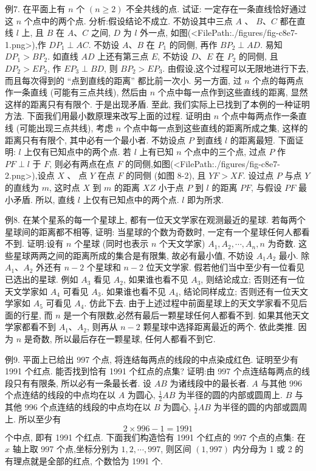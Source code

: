 例7. 在平面上有 $n$ 个 $(n \geqslant 2)$ 不全共线的点.
试证: 一定存在一条直线恰好通过这 $n$ 个点中的两个点.
分析:假设结论不成立.
不妨设其中三点 $A$ 、 $B 、 C$ 都在直线 $l$ 上, 且 $B$ 在 $A 、 C$ 之间, $D$ 为 $l$ 外一点, 如图(<FilePath:./figures/fig-c8e7-1.png>),作 $D P_1 \perp A C$. 不妨设 $A 、 B$ 在 $P_1$ 的同侧, 再作 $B P_2 \perp A D$. 易知 $D P_1>B P_2$. 如直线 $A D$ 上还有第三点 $E$, 不妨设 $D 、 E$ 在 $P_2$ 的同侧, 且 $D P_2>E P_2$, 作 $E P_3 \perp B D$, 则 $B P_2> E P_3$. 由假设,这个过程可以无限地进行下去, 而且每次得到的 “点到直线的距离” 都比前一次小.
另一方面, 过 $n$ 个点的每两点作一条直线 (可能有三点共线), 然后由 $n$ 个点中每一点作到这些直线的距离, 显然这样的距离只有有限个.
于是出现矛盾.
至此, 我们实际上已找到了本例的一种证明方法.
下面我们用最小数原理来改写上面的过程.
证明由 $n$ 个点中每两点作一条直线 (可能出现三点共线), 考虑 $n$ 个点中每一点到这些直线的距离所成之集, 这样的距离只有有限个, 其中必有一个最小者.
不妨设点 $P$ 到直线 $l$ 的距离最短.
下面证明: $l$ 上仅有已知点中的两个点.
若 $l$ 上有已知 $n$ 个点中的三个点, 过点 $P$ 作 $P F \perp l$ 于 $F$, 则必有两点在点 $F$ 的同侧,如图(<FilePath:./figures/fig-c8e7-2.png>),设点 $X$ 、 点 $Y$ 在点 $F$ 的同侧 (如图 8-2), 且 $Y F>X F$. 设过点 $P$ 与点 $Y$ 的直线为 $m$, 这时点 $X$ 到 $m$ 的距离 $X Z$ 小于点 $P$ 到 $l$ 的距离 $P F$, 与假设 $P F$ 最小矛盾.
所以, 直线 $l$ 上仅有已知点中的两个点.
$l$ 即为所求.



例8. 在某个星系的每一个星球上, 都有一位天文学家在观测最近的星球.
若每两个星球间的距离都不相等, 证明: 当星球的个数为奇数时, 一定有一个星球任何人都看不到.
证明:设有 $n$ 个星球 (同时也表示 $n$ 个天文学家) $A_1, A_2, \cdots, A_n, n$ 为奇数.
这些星球两两之间的距离所成的集合是有限集, 故必有最小值, 不妨设 $A_1 A_2$ 最小.
除 $A_1 、 A_2$ 外还有 $n-2$ 个星球和 $n-2$ 位天文学家.
假若他们当中至少有一位看见已选出的星球.
例如 $A_3$ 看见 $A_2$, 如果谁也看不见 $A_3$, 则结论成立; 否则还有一位天文学家如 $A_4$ 可看见 $A_3$. 如果谁也看不见 $A_4$, 结论同样成立; 否则还有一位天文学家如 $A_5$ 可看见 $A_4$. 仿此下去.
由于上述过程中前面星球上的天文学家看不见后面的行星, 而 $n$ 是一个有限数,必然有最后一颗星球任何人都看不到.
如果其他天文学家都看不到 $A_1 、 A_2$, 则再从 $n-2$ 颗星球中选择距离最近的两个.
依此类推.
因为 $n$ 是奇数, 所以最后存在一颗星球, 任何人都看不到它.



例9. 平面上已给出 997 个点, 将连结每两点的线段的中点染成红色.
证明至少有 1991 个红点.
能否找到恰有 1991 个红点的点集?
证明:由 997 个点连结每两点的线段只有有限条, 所以必有一条最长者.
设 $A B$ 为诸线段中的最长者.
$A$ 与其他 996 个点连结的线段的中点均在以 $A$ 为圆心, $\frac{1}{2} A B$ 为半径的圆的内部或圆周上.
$B$ 与其他 996 个点连结的线段的中点均在以 $B$ 为圆心, $\frac{1}{2} A B$ 为半径的圆的内部或圆周上.
所以至少有
$$
2 \times 996-1=1991
$$
个中点, 即有 1991 个红点.
下面我们构造恰有 1991 个红点的 997 个点的点集:
在 $x$ 轴上取 997 个点,坐标分别为 $1,2, \cdots, 997$, 则区间 $(1,997)$ 内分母为 1 或 2 的有理点就是全部的红点, 个数恰为 1991 个.



